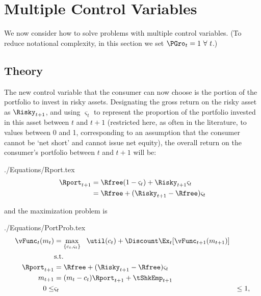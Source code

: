 \documentclass[titlepage]{\econtex}
\begin{document}
\hypertarget{Multiple-Control-Variables}{}
\section{Multiple Control Variables}

We now consider how to solve problems with multiple control variables.
(To reduce notational complexity, in this section we set $\PGro_{t}=1~\forall~t$.)

\subsection{Theory}
The new control variable that the consumer can now choose
is the portion of the portfolio to invest in risky assets.
Designating the gross return on the risky asset
as $\Risky_{t+1}$, and using $\varsigma_{t}$ to represent the
proportion of the portfolio invested in this asset between $t$ and $t+1$
(restricted here, as often in the literature, to values between 0 and
1, corresponding to an assumption that the consumer cannot be `net
short' and cannot issue net equity), the overall return on
the consumer's portfolio between $t$ and $t+1$ will be:
\begin{verbatimwrite}{./Equations/Rport.tex}
  \begin{equation}\begin{gathered}\begin{aligned}
    \Rport_{t+1}  & = \Rfree(1-\varsigma_{t}) + \Risky_{t+1}\varsigma_{t} \label{eq:return1}
    \\               & = \Rfree + (\Risky_{t+1}-\Rfree) \varsigma_{t} \label{eq:return2}
  \end{aligned}\end{gathered}\end{equation}
\end{verbatimwrite}

and the maximization problem is
\begin{verbatimwrite}{./Equations/PortProb.tex}
  \begin{equation*}\begin{gathered}\begin{aligned}
    {\vFunc}_{t}({m}_{t})  & = \max_{\{{c}_{t},\varsigma_{t}\}}   ~~ \util({c}_{t}) +  \Discount
                                \Ex_{t}[{\vFunc}_{t+1}({m}_{t+1})]
    \\      & \text{s.t.} & \nonumber
    \\      \Rport_{t+1}  & = \Rfree + (\Risky_{t+1}-\Rfree) \varsigma_{t}
    \\      {m}_{t+1}  & = ({m}_{t}-{c}_{t})\Rport_{t+1} + \tShkEmp_{t+1}
    \\  0       \leq & \varsigma_{t} & \leq 1, \label{eq:noshorts}
  \end{aligned}\end{gathered}\end{equation*}
\end{verbatimwrite}
\end{document}
